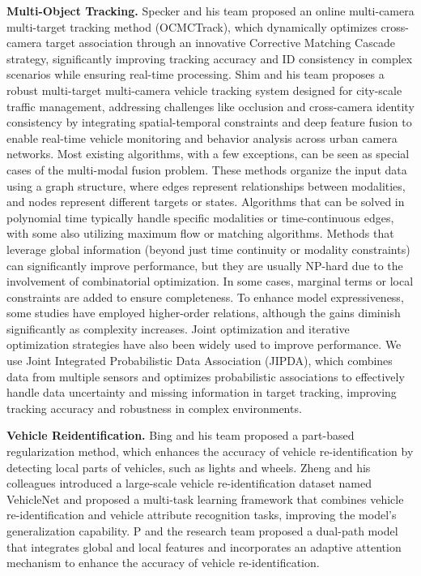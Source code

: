 \documentclass[lettersize,journal]{IEEEtran}
\begin{document}
\textbf{Multi-Object Tracking.}
Specker and his team proposed an online multi-camera multi-target tracking method (OCMCTrack), which dynamically optimizes cross-camera target association through an innovative Corrective Matching Cascade strategy, significantly improving tracking accuracy and ID consistency in complex scenarios while ensuring real-time processing\cite{Alpher24e}.
Shim and his team proposes a robust multi-target multi-camera vehicle tracking system designed for city-scale traffic management, addressing challenges like occlusion and cross-camera identity consistency by integrating spatial-temporal constraints and deep feature fusion to enable real-time vehicle monitoring and behavior analysis across urban camera networks\cite{Alpher21e}.
Most existing algorithms, with a few exceptions, can be seen as special cases of the multi-modal fusion problem. 
These methods organize the input data using a graph structure, where edges represent relationships between modalities, and nodes represent different targets or states. 
Algorithms that can be solved in polynomial time typically handle specific modalities or time-continuous edges, with some also utilizing maximum flow or matching algorithms. 
Methods that leverage global information (beyond just time continuity or modality constraints) can significantly improve performance, but they are usually NP-hard due to the involvement of combinatorial optimization. 
In some cases, marginal terms or local constraints are added to ensure completeness. 
To enhance model expressiveness, some studies have employed higher-order relations, although the gains diminish significantly as complexity increases. 
Joint optimization and iterative optimization strategies have also been widely used to improve performance.
We use Joint Integrated Probabilistic Data Association (JIPDA), which combines data from multiple sensors and optimizes probabilistic associations to effectively handle data uncertainty and missing information in target tracking, improving tracking accuracy and robustness in complex environments.


\textbf{Vehicle Reidentification.}
Bing and his team proposed a part-based regularization method, which enhances the accuracy of vehicle re-identification by detecting local parts of vehicles, such as lights and wheels\cite{Alpher19b}. 
Zheng and his colleagues introduced a large-scale vehicle re-identification dataset named VehicleNet and proposed a multi-task learning framework that combines vehicle re-identification and vehicle attribute recognition tasks, improving the model's generalization capability\cite{Alpher20f}. 
P and the research team proposed a dual-path model that integrates global and local features and incorporates an adaptive attention mechanism to enhance the accuracy of vehicle re-identification\cite{Alpher19c}.
\end{document}
